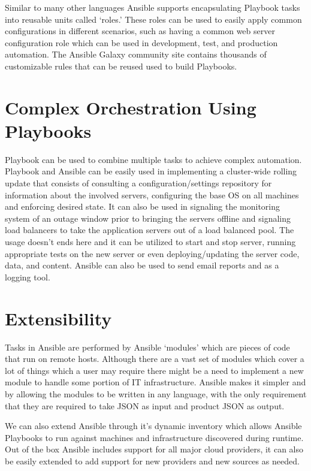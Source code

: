 \documentclass[9pt,twocolumn,twoside]{styles/osajnl}
\begin{document}
Similar to many other languages Ansible supports encapsulating
Playbook tasks into reusable units called ‘roles.’ These roles can be
used to easily apply common configurations in different scenarios,
such as having a common web server configuration role which can be
used in development, test, and production automation. The Ansible
Galaxy community site contains thousands of customizable rules that
can be reused used to build Playbooks.

\section{Complex Orchestration Using Playbooks}

Playbook can be used to combine multiple tasks to achieve complex
automation.\cite{www-ansible5} Playbook and Ansible can be easily used
in implementing a cluster-wide rolling update that consists of
consulting a configuration/settings repository for information about
the involved servers, configuring the base OS on all machines and
enforcing desired state. It can also be used in signaling the
monitoring system of an outage window prior to bringing the servers
offline and signaling load balancers to take the application servers
out of a load balanced pool. The usage doesn't ends here and it can be
utilized to start and stop server, running appropriate tests on the
new server or even deploying/updating the server code, data, and
content. Ansible can also be used to send email reports and as a
logging tool.\cite{www-ansible}

\section{Extensibility}

Tasks in Ansible are performed by Ansible ‘modules’ which are pieces
of code that run on remote hosts. Although there are a vast set of
modules which cover a lot of things which a user may require there
might be a need to implement a new module to handle some portion of IT
infrastructure. Ansible makes it simpler and by allowing the modules
to be written in any language, with the only requirement that they are
required to take JSON as input and product JSON as
output.\cite{www-ansible}

We can also extend Ansible through it's dynamic inventory which allows
Ansible Playbooks to run against machines and infrastructure
discovered during runtime. Out of the box Ansible includes support for
all major cloud providers, it can also be easily extended to add
support for new providers and new sources as needed.
\end{document}
